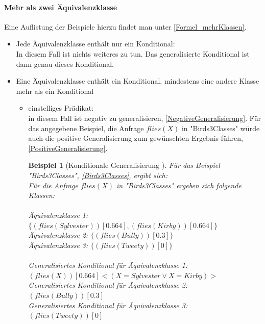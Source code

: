 \documentclass[a4paper, 11pt]{book}
\newtheorem{Bsp}{Beispiel}[section]
\begin{document}
\paragraph{Mehr als zwei Äquivalenzklasse} 
Eine Auflistung der Beispiele hierzu findet man unter \ref{Formel_mehrKlassen}.
\begin{itemize}
	\item Jede Äquivalenzklasse enthält nur ein Konditional:\\
	In diesem Fall ist nichts weiteres zu tun. Das generalisierte Konditional ist dann genau dieses Konditional.
	\item Eine Äquivalenzklasse enthält ein Konditional, mindestens eine andere Klasse mehr als ein Konditional
	\begin{itemize}
		\item einstelliges Prädikat:\\
		 in diesem Fall ist negativ zu generalisieren, \ref{NegativeGeneralisierung}. Für das angegebene Beispiel, die Anfrage $ flies(X) $ in "{}Birds3Classes"{} würde auch die positive Generalisierung zum gewünschten Ergebnis führen, \ref{PositiveGeneralisierung}.
		\begin{Bsp}[Konditionale Generalisierung ]
			Für das Beispiel \\ "{}Birds3Classes"{}, \ref{Birds3Classes}, ergibt sich:\\
			Für die Anfrage $ flies(X) $ in "{}Birds3Classes"{} ergeben sich folgende Klassen:\\
			\\
			Äquivalenzklasse 1: $ \{(flies(Sylvester))[0.664], (flies(Kirby))[0.664]\}  $\\
			Äquivalenzklasse 2: $ \{(flies(Bully))[0.3]\} $\\
			Äquivalenzklasse 3: $ \{(flies(Tweety))[0]\} $\\
			\\
			\noindent
			Generalisiertes Konditional für Äquivalenzklasse 1:\\ $ (flies(X))[0.664]<(X = Sylvester \lor  X = Kirby)>$\\
			Generalisiertes  Konditional für Äquivalenzklasse 2:\\ $ (flies(Bully))[0.3] $\\
			Generalisiertes Konditional für Äquivalenzklasse 3: \\$ (flies(Tweety))[0] $\\
		

\end{Bsp}
\end{itemize}
\end{itemize}
\end{document}
